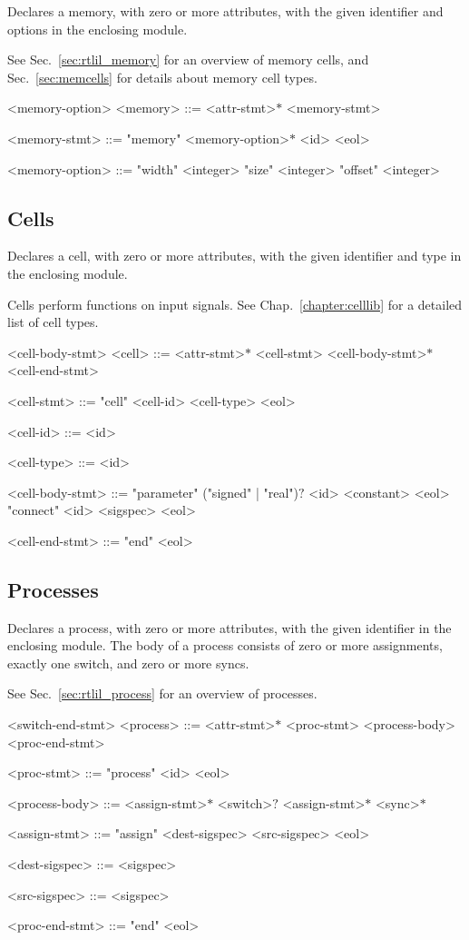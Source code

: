 Declares a memory, with zero or more attributes, with the given identifier and options in the enclosing module.

See Sec.~\ref{sec:rtlil_memory} for an overview of memory cells, and Sec.~\ref{sec:memcells} for details about memory cell types.

\begin{indentgrammar}{<memory-option>}
<memory> ::= <attr-stmt>$*$ <memory-stmt>

<memory-stmt> ::= "memory" <memory-option>$*$ <id> <eol>

<memory-option> ::= 
"width" <integer>
  \alt "size" <integer>
  \alt "offset" <integer>
\end{indentgrammar}

\subsection{Cells}

Declares a cell, with zero or more attributes, with the given identifier and type in the enclosing module. 

Cells perform functions on input signals. See Chap.~\ref{chapter:celllib} for a detailed list of cell types.

\begin{indentgrammar}{<cell-body-stmt>}
<cell> ::= <attr-stmt>$*$ <cell-stmt> <cell-body-stmt>$*$ <cell-end-stmt>

<cell-stmt> ::= "cell" <cell-id> <cell-type> <eol>

<cell-id> ::= <id>

<cell-type> ::= <id>

<cell-body-stmt> ::= 
"parameter" ("signed" | "real")$?$ <id> <constant> <eol>
  \alt "connect" <id> <sigspec> <eol>

<cell-end-stmt> ::= "end" <eol>
\end{indentgrammar}

\subsection{Processes}

Declares a process, with zero or more attributes, with the given identifier in the enclosing module. The body of a process consists of zero or more assignments, exactly one switch, and zero or more syncs.

See Sec.~\ref{sec:rtlil_process} for an overview of processes.

\begin{indentgrammar}{<switch-end-stmt>}
<process> ::= <attr-stmt>$*$ <proc-stmt> <process-body> <proc-end-stmt>

<proc-stmt> ::= "process" <id> <eol>

<process-body> ::= <assign-stmt>$*$ <switch>$?$ <assign-stmt>$*$ <sync>$*$

<assign-stmt> ::= "assign" <dest-sigspec> <src-sigspec> <eol>

<dest-sigspec> ::= <sigspec>

<src-sigspec> ::= <sigspec>

<proc-end-stmt> ::= "end" <eol>

\end{indentgrammar}

